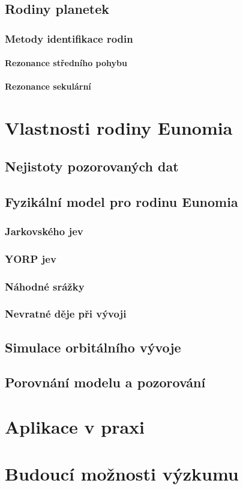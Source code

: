 \documentclass[A4paper, 12pt, oneside]{book}
\begin{document}
\section{Rodiny planetek}
\subsection{Metody identifikace rodin}
\subsubsection{Rezonance středního pohybu}
\subsubsection{Rezonance sekulární}

\chapter{Vlastnosti rodiny Eunomia}
\section{Nejistoty pozorovaných dat}
\section{Fyzikální model pro rodinu Eunomia}
\subsection{Jarkovského jev}
\subsection{YORP jev}
\subsection{Náhodné srážky}
\subsection{Nevratné děje při vývoji}
\section{Simulace orbitálního vývoje}
\section{Porovnání modelu a pozorování}

\chapter{Aplikace v praxi}
\chapter{Budoucí možnosti výzkumu}

\printbibliography
\end{document}
